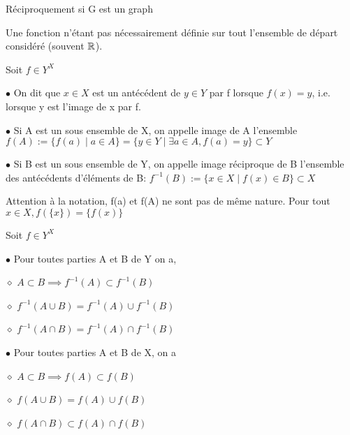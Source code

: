 \documentclass[a4paper, 12pt]{article}
\begin{document}
\begin{remark}
    Réciproquement si G est un graph %
\end{remark}

\begin{remark}
    Une fonction n'étant pas nécessairement définie sur tout l'ensemble de départ considéré (souvent $\mathbb{R}$).
\end{remark}

\begin{definition}
    Soit $f \in Y^X$

    \item $\bullet$ On dit que $x \in X$ est un antécédent de $y \in Y$ par f lorsque $f(x) = y$, i.e. lorsque y est l'image de x par f.
    \item $\bullet$ Si A est un sous ensemble de X, on appelle image de A l'ensemble
    $f(A) := \{f(a) \mid a \in A\} = \{y \in Y \mid \exists a \in A, f(a) = y\} \subset Y$
    \item $\bullet$ Si B est un sous ensemble de Y, on appelle image réciproque de B l'ensemble des antécédents d'éléments de B:
    $f^{-1}(B) := \{x \in X \mid f(x) \in B\} \subset X$
\end{definition}

\begin{remark}
    Attention à la notation, f(a) et f(A) ne sont pas de même nature.
    Pour tout $x \in X, f(\{x\}) = \{f(x)\}$
\end{remark}

\begin{theorem}
    Soit $f \in Y^X$

    \item $\bullet$ Pour toutes parties A et B de Y on a,
    
    \item $\diamond$ $A \subset B \implies f^{-1}(A) \subset f^{-1}(B)$

    \item $\diamond$ $f^{-1}(A \cup B) = f^{-1}(A) \cup f^{-1}(B)$
    
    \item $\diamond$ $f^{-1}(A \cap B) = f^{-1}(A) \cap f^{-1}(B)$
    
    \item $\bullet$ Pour toutes parties A et B de X, on a
    
    \item $\diamond$ $A \subset B \implies f(A) \subset f(B)$
    \item $\diamond$ $f(A \cup B) = f(A) \cup f(B)$
    \item $\diamond$ $f(A \cap B) \subset f(A) \cap f(B)$
\end{theorem}

\begin{demonstration}
\end{demonstration}
\end{document}

